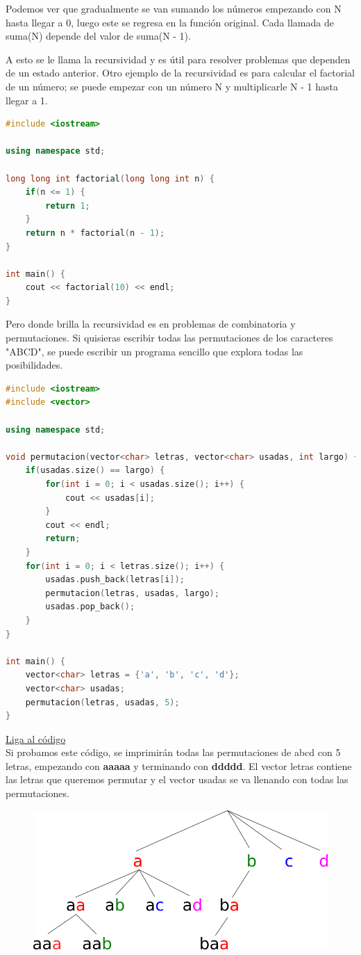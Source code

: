 \documentclass{article}
\begin{document}
Podemos ver que gradualmente se van sumando los números empezando con N hasta llegar a 0, luego este se regresa en la función original. Cada llamada de suma(N) depende del valor de suma(N - 1).

A esto se le llama la recursividad y es útil para resolver problemas que dependen de un estado anterior. Otro ejemplo de la recursividad es para calcular el factorial de un número; se puede empezar con un número N y multiplicarle N - 1 hasta llegar a 1.

\begin{lstlisting}[language=C++, title=Factorial recursivo]
#include <iostream>

using namespace std;

long long int factorial(long long int n) {
	if(n <= 1) {
		return 1;
	}
	return n * factorial(n - 1);
}

int main() {
	cout << factorial(10) << endl;
}
\end{lstlisting}

Pero donde brilla la recursividad es en problemas de combinatoria y permutaciones. Si quisieras escribir todas las permutaciones de los caracteres "ABCD", se puede escribir un programa sencillo que explora todas las posibilidades.

\begin{lstlisting}[language=C++, title=Permutaciones]
#include <iostream>
#include <vector>

using namespace std;

void permutacion(vector<char> letras, vector<char> usadas, int largo) {
	if(usadas.size() == largo) {
		for(int i = 0; i < usadas.size(); i++) {
			cout << usadas[i];
		}
		cout << endl;
		return;
	}
	for(int i = 0; i < letras.size(); i++) {
		usadas.push_back(letras[i]);
		permutacion(letras, usadas, largo);
		usadas.pop_back();
	}
}

int main() {
	vector<char> letras = {'a', 'b', 'c', 'd'};
	vector<char> usadas;
	permutacion(letras, usadas, 5);
}
\end{lstlisting}
\href{https://repl.it/@Jamesscn/Permutando}{Liga al código} \\

Si probamos este código, se imprimirán todas las permutaciones de abcd con 5 letras, empezando con \textbf{aaaaa} y terminando con \textbf{ddddd}. El vector letras contiene las letras que queremos permutar y el vector usadas se va llenando con todas las permutaciones.

\begin{figure}[H]
    \centering
    \includegraphics[width=0.3\paperwidth]{permutacion}
\end{figure}
\end{document}
